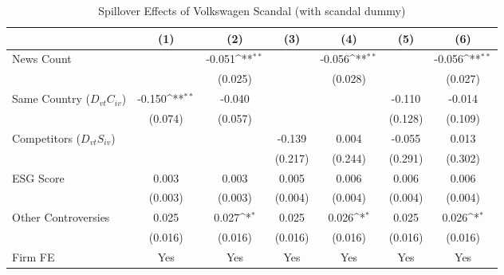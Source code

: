 \begin{table}[htbp]\centering
\def\sym#1{\ifmmode^{#1}\else\(^{#1}\)\fi}
\caption{Spillover Effects of Volkswagen Scandal (with scandal dummy)}
\begin{tabular}{l*{6}{c}}
\toprule
                    &\multicolumn{1}{c}{(1)}         &\multicolumn{1}{c}{(2)}         &\multicolumn{1}{c}{(3)}         &\multicolumn{1}{c}{(4)}         &\multicolumn{1}{c}{(5)}         &\multicolumn{1}{c}{(6)}         \\
\midrule
News Count          &                     &      -0.051\sym{**} &                     &      -0.056\sym{**} &                     &      -0.056\sym{**} \\
                    &                     &     (0.025)         &                     &     (0.028)         &                     &     (0.027)         \\
\addlinespace
Same Country ($ D_{vt} C_{iv}$)&      -0.150\sym{**} &      -0.040         &                     &                     &      -0.110         &      -0.014         \\
                    &     (0.074)         &     (0.057)         &                     &                     &     (0.128)         &     (0.109)         \\
\addlinespace
Competitors ($ D_{vt} S_{iv}$)&                     &                     &      -0.139         &       0.004         &      -0.055         &       0.013         \\
                    &                     &                     &     (0.217)         &     (0.244)         &     (0.291)         &     (0.302)         \\
\addlinespace
ESG Score           &       0.003         &       0.003         &       0.005         &       0.006         &       0.006         &       0.006         \\
                    &     (0.003)         &     (0.003)         &     (0.004)         &     (0.004)         &     (0.004)         &     (0.004)         \\
\addlinespace
Other Controversies &       0.025         &       0.027\sym{*}  &       0.025         &       0.026\sym{*}  &       0.025         &       0.026\sym{*}  \\
                    &     (0.016)         &     (0.016)         &     (0.016)         &     (0.016)         &     (0.016)         &     (0.016)         \\
\midrule
Firm FE             &         Yes         &         Yes         &         Yes         &         Yes         &         Yes         &         Yes         \\

\end{tabular}
\end{table}
